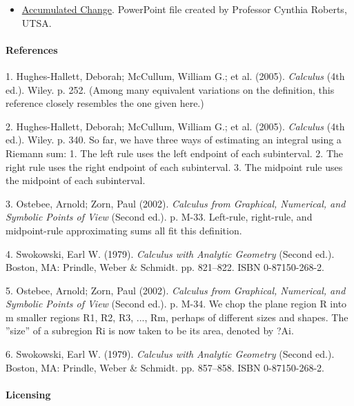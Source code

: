 \begin{itemize}
    \item \href{https://mathresearch.utsa.edu/wikiFiles/MAT1193/Accumulated\%20Change/Presentation11_Distance_Definite_Integral.pptx}{Accumulated Change}. PowerPoint file created by Professor Cynthia Roberts, UTSA.
\end{itemize}

\paragraph{References}



1. Hughes-Hallett, Deborah; McCullum, William G.; et al. (2005). \textit{Calculus} (4th ed.). Wiley. p. 252. (Among many equivalent variations on the definition, this reference closely resembles the one given here.)

2. Hughes-Hallett, Deborah; McCullum, William G.; et al. (2005). \textit{Calculus} (4th ed.). Wiley. p. 340. So far, we have three ways of estimating an integral using a Riemann sum: 1. The left rule uses the left endpoint of each subinterval. 2. The right rule uses the right endpoint of each subinterval. 3. The midpoint rule uses the midpoint of each subinterval.

3. Ostebee, Arnold; Zorn, Paul (2002). \textit{Calculus from Graphical, Numerical, and Symbolic Points of View} (Second ed.). p. M-33. Left-rule, right-rule, and midpoint-rule approximating sums all fit this definition.

4. Swokowski, Earl W. (1979). \textit{Calculus with Analytic Geometry} (Second ed.). Boston, MA: Prindle, Weber \& Schmidt. pp. 821–822. ISBN 0-87150-268-2.

5. Ostebee, Arnold; Zorn, Paul (2002). \textit{Calculus from Graphical, Numerical, and Symbolic Points of View} (Second ed.). p. M-34. We chop the plane region R into m smaller regions R1, R2, R3, ..., Rm, perhaps of different sizes and shapes. The ''size'' of a subregion Ri is now taken to be its area, denoted by ?Ai.

6. Swokowski, Earl W. (1979). \textit{Calculus with Analytic Geometry} (Second ed.). Boston, MA: Prindle, Weber \& Schmidt. pp. 857–858. ISBN 0-87150-268-2.



\paragraph{Licensing}



